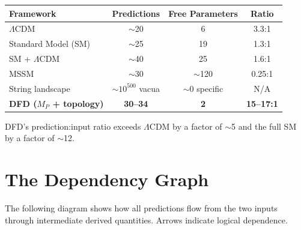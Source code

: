 \documentclass[12pt,a4paper]{article}
\begin{document}
\begin{center}
\renewcommand{\arraystretch}{1.3}
\begin{tabular}{lccc}
\toprule
\textbf{Framework} & \textbf{Predictions} & \textbf{Free Parameters}
  & \textbf{Ratio} \\
\midrule
$\Lambda$CDM & $\sim$20 & 6 & 3.3:1 \\
Standard Model (SM) & $\sim$25 & 19 & 1.3:1 \\
SM + $\Lambda$CDM & $\sim$40 & 25 & 1.6:1 \\
MSSM & $\sim$30 & $\sim$120 & 0.25:1 \\
String landscape & $\sim 10^{500}$ vacua & $\sim$0 specific & N/A \\
\midrule
\textbf{DFD ($M_P$ + topology)} & \textbf{30--34} & \textbf{2} & \textbf{15--17:1} \\
\bottomrule
\end{tabular}
\end{center}

DFD's prediction:input ratio exceeds $\Lambda$CDM by a factor of $\sim$5
and the full SM by a factor of $\sim$12.

\section{The Dependency Graph}
\label{sec:graph}

The following diagram shows how all predictions flow from the two inputs
through intermediate derived quantities.  Arrows indicate logical
dependence.
\end{document}
